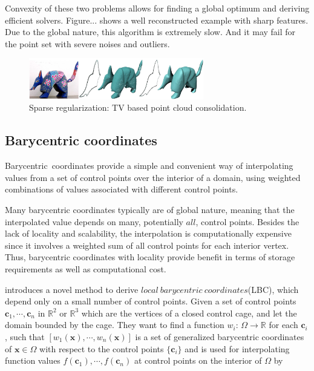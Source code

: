 Convexity of these two problems allows for finding a global optimum and deriving efficient solvers.
Figure... shows a well reconstructed example with sharp features.
Due to the global nature, this algorithm is extremely slow.
And it may fail for the point set with severe noises and outliers.

\begin{figure}[ht]
  \centering
  \includegraphics[width=3in]{images/TV_consolidation}
  \caption{Sparse regularization: TV based point cloud consolidation\cite{lipman2007parameterization}.}
  \label{fig:TV consolidation}
\end{figure}


\subsection{Barycentric coordinates}
\label{subsec:Barycentric coordinates}

Barycentric~coordinates provide a simple and convenient way of interpolating values from a set of control points over the interior of a domain, using weighted combinations of values associated with different control points.

Many barycentric coordinates typically are of global nature, meaning that the interpolated value depends on many, potentially $all$, control points. Besides the lack of locality and scalability, the interpolation is computationally expensive since it involves a weighted sum of all control points for each interior vertex.
Thus, barycentric coordinates with locality provide benefit in terms of storage requirements as well as computational cost.

\cite{zhang2014local} introduces a novel method to derive $local~barycentric~coordinates$(LBC), which depend only on a small number of control points.
Given a set of control points $\mathbf{c}_1, \cdots, \mathbf{c}_n$ in $\mathbb{R}^2$ or  $\mathbb{R}^3$ which are the vertices of a closed control cage, and let the domain bounded by the cage.
They want to find a function $w_{i}$: $\Omega\rightarrow\mathbb{R}$ for each $\mathbf{c}_{i}$, such that $[w_1(\mathbf{x}), \cdots, w_n(\mathbf{x})]$ is a set of generalized barycentric coordinates of $\mathbf{x}\in\Omega$ with respect to the control points $\{\mathbf{c}_{i}\}$ and is used for interpolating function values $f(\mathbf{c}_1), \cdots, f(\mathbf{c}_n)$ at control points on the interior of $\Omega$ by

